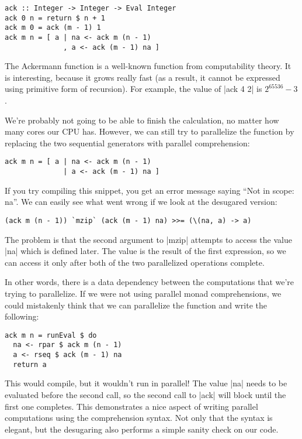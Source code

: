 \documentclass{tmr}
\begin{document}
\begin{verbatim}
ack :: Integer -> Integer -> Eval Integer
ack 0 n = return $ n + 1
ack m 0 = ack (m - 1) 1
ack m n = [ a | na <- ack m (n - 1)
              , a <- ack (m - 1) na ]
\end{verbatim}
The Ackermann function is a well-known function from computability theory. It is interesting, 
because it grows really fast (as a result, it cannot be expressed using primitive form of 
recursion). For example, the value of |ack 4 2| is $2^{65536} - 3$. 

We're probably not going to be able to finish the calculation, no matter how many cores our CPU 
has. However, we can still try to parallelize the function by replacing the two sequential 
generators with parallel comprehension:

\begin{verbatim}
ack m n = [ a | na <- ack m (n - 1)
              | a <- ack (m - 1) na ]
\end{verbatim}
If you try compiling this snippet, you get an error message saying ``Not in scope: na''. We can 
easily see what went wrong if we look at the desugared version:

\begin{verbatim}
(ack m (n - 1)) `mzip` (ack (m - 1) na) >>= (\(na, a) -> a)
\end{verbatim}
The problem is that the second argument to |mzip| attempts to access the value |na| which is 
defined later. The value is the result of the first expression, so we can access it only after 
both of the two parallelized operations complete. 

In other words, there is a data dependency between the computations that we're trying to 
parallelize. If we were not using parallel monad comprehensions, we could mistakenly think 
that we can parallelize the function and write the following:

\begin{verbatim}
ack m n = runEval $ do 
  na <- rpar $ ack m (n - 1)
  a <- rseq $ ack (m - 1) na
  return a
\end{verbatim}
This would compile, but it wouldn't run in parallel! The value |na| needs to be evaluated before 
the second call, so the second call to |ack| will block until the first one completes. This 
demonstrates a nice aspect of writing parallel computations using the comprehension syntax. 
Not only that the syntax is elegant, but the desugaring also performs a simple sanity check on our code.
\end{document}
